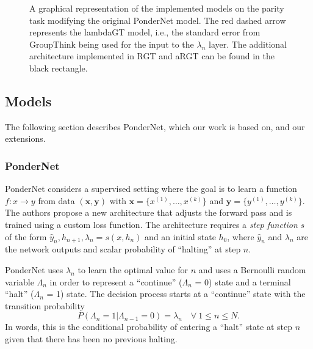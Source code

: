 \documentclass{article}
\begin{document}
\begin{figure}[ht]
\caption{A graphical representation of the implemented models on the parity task modifying the original PonderNet model. The red dashed arrow represents the lambdaGT model, i.e., the standard error from GroupThink being used for the input to the $\lambda_n$ layer. The additional architecture implemented in RGT and aRGT can be found in the black rectangle.}
\label{fig:models}
\end{figure}

\subsection{Models} \label{models}

The following section describes PonderNet, which our work is based on, and our extensions.

\subsubsection{PonderNet} \label{pondernet}
PonderNet \citep{banino_pondernet_2021} considers a supervised setting where the goal is to learn a function $f : x \rightarrow y$ from data $(\textbf{x},\textbf{y})$ with $\textbf{x} = \{x^{(1)}, \ldots, x^{(k)}\}$ and $\textbf{y} = \{y^{(1)}, \ldots, y^{(k)}\}$. The authors propose a new architecture that adjusts the forward pass and is trained using a custom loss function. The architecture requires a \textit{step function} $s$ of the form $\hat y_n, h_{n+1}, \lambda_n = s(x,h_n)$ and an initial state $h_0$, where $\hat y_n$ and $\lambda_n$ are the network outputs and scalar probability of ``halting'' at step $n$. 

PonderNet uses $\lambda_n$ to learn the optimal value for $n$ and uses a Bernoulli random variable $\Lambda_n$ in order to represent a ``continue'' ($\Lambda_n$ = 0) state and a terminal ``halt'' ($\Lambda_n$ = 1) state. The decision process starts at a ``continue'' state with the transition probability  
\begin{equation}
    P(\Lambda_n=1 | \Lambda_{n-1}=0) = \lambda_n \quad \forall~1 \leq n \leq N.
\end{equation}
In words, this is the conditional probability of entering a ``halt'' state at step $n$ given that there has been no previous halting.
\end{document}
